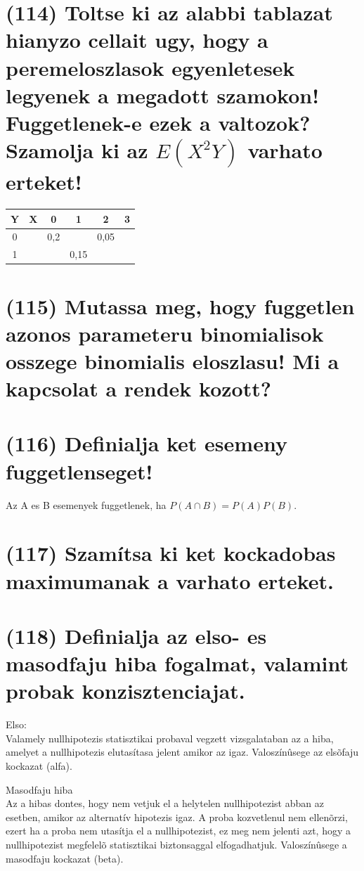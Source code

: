 \documentclass[12p]{article}
\begin{document}
\section{(114) Toltse ki az alabbi tablazat hianyzo cellait ugy, hogy a peremeloszlasok egyenletesek
legyenek a megadott szamokon! Fuggetlenek-e ezek a valtozok? Szamolja ki az $E(X^2Y)$ varhato erteket!}

\begin{center}
 \begin{tabular}{| c c || c | c | c | c |} 
 \hline
 Y & X &  0 & 1 & 2 & 3\\ [0.5ex] 
 \hline\hline
 0 &  & 0,2 & & 0,05 & \\ 
 \hline
 1 &  & & 0,15 & & \\
 \hline\hline
\end{tabular}
\end{center}

\section{(115) Mutassa meg, hogy fuggetlen azonos parameteru binomialisok osszege binomialis eloszlasu! Mi a kapcsolat a rendek kozott?}

\section{(116) Definialja ket esemeny fuggetlenseget!}

Az A es B esemenyek fuggetlenek, ha $P(A \cap B) = P(A)P(B)$.

\section{(117) Szamítsa ki ket kockadobas maximumanak a varhato erteket.}

\section{(118) Definialja az elso- es masodfaju hiba fogalmat, valamint probak konzisztenciajat.}

Elso:\\
Valamely nullhipotezis statisztikai probaval vegzett vizsgalataban az a hiba, amelyet a nullhipotezis elutasítasa jelent amikor az igaz. Valoszínûsege az elsõfaju kockazat (alfa). 

Masodfaju hiba\\
Az a hibas dontes, hogy nem vetjuk el a helytelen nullhipotezist abban az esetben, amikor az alternatív hipotezis igaz. A proba kozvetlenul nem ellenõrzi, ezert ha a proba nem utasítja el a nullhipotezist, ez meg nem jelenti azt, hogy a nullhipotezist megfelelõ statisztikai biztonsaggal elfogadhatjuk. Valoszínûsege a masodfaju kockazat (beta). 
\end{document}
